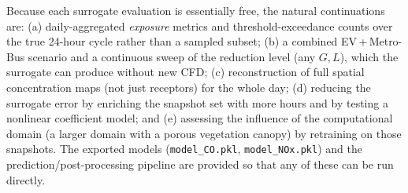 \documentclass[11pt]{article}
\begin{document}
Because each surrogate evaluation is essentially free, the natural continuations are:
(a) daily-aggregated \emph{exposure} metrics and threshold-exceedance counts over the true 24-hour
cycle rather than a sampled subset; (b) a combined EV\,+\,Metro-Bus scenario and a continuous sweep
of the reduction level (any $G,L$), which the surrogate can produce without new CFD;
(c) reconstruction of full spatial concentration maps (not just receptors) for the whole day;
(d) reducing the surrogate error by enriching the snapshot set with more hours and by testing a
nonlinear coefficient model; and (e) assessing the influence of the computational domain (a larger
domain with a porous vegetation canopy) by retraining on those snapshots. The exported models
(\texttt{model\_CO.pkl}, \texttt{model\_NOx.pkl}) and the prediction/post-processing pipeline are
provided so that any of these can be run directly.
\end{document}
